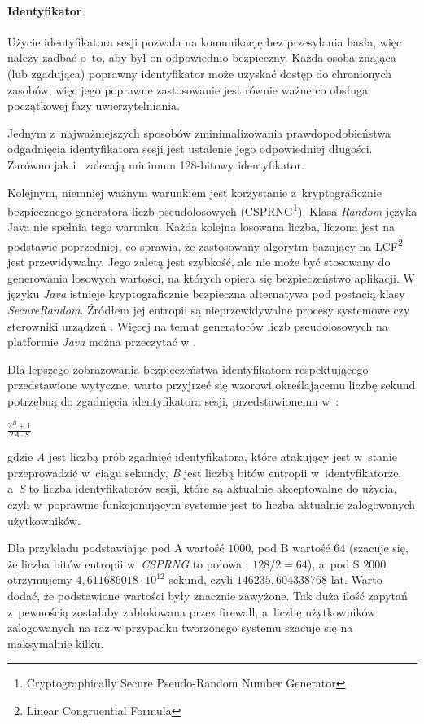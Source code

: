 \documentclass[11pt]{aghdpl}
\begin{document}
\paragraph{Identyfikator}
\label{sec:identyfikator}

Użycie identyfikatora sesji pozwala na komunikację bez przesyłania hasła, więc należy zadbać o~to, aby był on odpowiednio bezpieczny. Każda osoba znająca (lub zgadująca) poprawny identyfikator może uzyskać dostęp do chronionych zasobów, więc jego poprawne zastosowanie jest równie ważne co obsługa początkowej fazy uwierzytelniania.

Jednym z~najważniejszych sposobów zminimalizowania prawdopodobieństwa odgadnięcia identyfikatora sesji jest ustalenie jego odpowiedniej długości. Zarówno \cite{SId} jak i~\cite{SeMa08} zalecają minimum 128-bitowy identyfikator.

Kolejnym, niemniej ważnym warunkiem jest korzystanie z~kryptograficznie bezpiecznego generatora liczb pseudolosowych (CSPRNG\footnote{Cryptographically Secure Pseudo-Random Number Generator}). Klasa \emph{Random} języka Java nie spełnia tego warunku. Każda kolejna losowana liczba, liczona jest na podstawie poprzedniej, co sprawia, że zastosowany algorytm bazujący na LCF\footnote{Linear Congruential Formula} jest przewidywalny. Jego zaletą jest szybkość, ale nie może być stosowany do generowania losowych wartości, na których opiera się bezpieczeństwo aplikacji. W języku \emph{Java} istnieje kryptograficznie bezpieczna alternatywa pod postacią klasy \emph{SecureRandom}. Źródłem jej entropii są nieprzewidywalne procesy systemowe czy sterowniki urządzeń \cite{RND}. Więcej na temat generatorów liczb pseudolosowych na platformie \emph{Java} można przeczytać w \cite{SRNGiJ}.

Dla lepszego zobrazowania bezpieczeństwa identyfikatora respektującego przedstawione wytyczne, warto przyjrzeć się wzorowi określającemu liczbę sekund potrzebną do zgadnięcia identyfikatora sesji, przedstawionemu w~\cite{SId}:

$\frac{2^{B} + 1}{2A \cdot S}$

gdzie \emph{A} jest liczbą prób zgadnięć identyfikatora, które atakujący jest w~stanie przeprowadzić w~ciągu sekundy, \emph{B} jest liczbą bitów entropii w~identyfikatorze, a~\emph{S} to liczba identyfikatorów sesji, które są aktualnie akceptowalne do użycia, czyli w~poprawnie funkcjonującym systemie jest to liczba aktualnie zalogowanych użytkowników.

Dla przykładu podstawiając pod A wartość $1000$, pod B wartość $64$ (szacuje się, że liczba bitów entropii w~\emph{CSPRNG} to połowa \cite{SId,SMC}; $128/2=64$), a~pod S $2000$ otrzymujemy $4,611686018\cdot10^{12}$ sekund, czyli $146235,604338768$ lat. Warto dodać, że podstawione wartości były znacznie zawyżone. Tak duża ilość zapytań z~pewnością zostałaby zablokowana przez firewall, a~liczbę użytkowników zalogowanych na raz w przypadku tworzonego systemu szacuje się na maksymalnie kilku.
\end{document}
